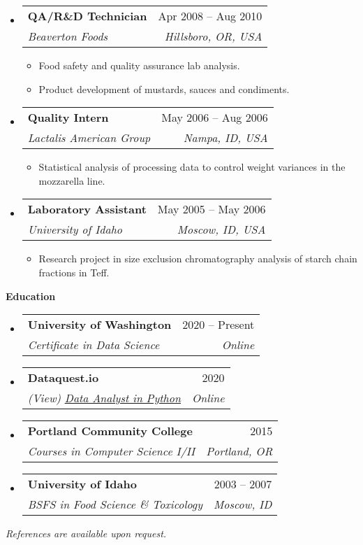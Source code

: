 \documentclass[letterpaper,12pt]{article}[leftmargin=*]
\makeatletter
\def \entryspacing {-0pt}
\newcommand{\education}[2]{\vspace{6pt}
  \colorbox{Copper}{\color{white}\raggedbottom\normalsize\textbf{{#1}{\hspace{9pt}#2\hspace{4pt}}}}
}
\newcommand{\resumeEntryStart}{\begin{itemize}[leftmargin=2.5mm]}
\newcommand{\resumeEntryEnd}{\end{itemize}\vspace{\entryspacing}}
\newcommand{\resumeItemListStart}{\begin{itemize}[leftmargin=4.5mm]}
\newcommand{\resumeItemListEnd}{\end{itemize}}
\newcommand{\resumeItem}[1]{
  \item\small{
    {#1 \vspace{-2pt}}
  }
}
\newcommand{\resumeEntryTSDL}[4]{
  \vspace{-1pt}\item[]
    \begin{tabularx}{0.97\textwidth}{X@{\hspace{60pt}}r}
      \textbf{\color{primary}#1} & {\firabook\color{accent}\small#2} \\
      \textit{\color{accent}\small#3} & \textit{\color{accent}\small#4} \\
    \end{tabularx}\vspace{-6pt}
}
\makeatother
\begin{document}
  \resumeEntryStart
    \resumeEntryTSDL
      {QA/R\&D Technician}{Apr 2008 -- Aug 2010}
      {Beaverton Foods}{Hillsboro, OR, USA}
    \resumeItemListStart
      \resumeItem {Food safety and quality assurance lab analysis.}
      \resumeItem {Product development of mustards, sauces and condiments.}
    \resumeItemListEnd
  \resumeEntryEnd
  
  \resumeEntryStart
    \resumeEntryTSDL
      {Quality Intern}{May 2006 -- Aug 2006}
      {Lactalis American Group}{Nampa, ID, USA}
    \resumeItemListStart
      \resumeItem {Statistical analysis of processing data to control weight variances in the mozzarella line.}
    \resumeItemListEnd
  \resumeEntryEnd
  
  \resumeEntryStart
    \resumeEntryTSDL
      {Laboratory Assistant}{May 2005 -- May 2006}
      {University of Idaho}{Moscow, ID, USA}
    \resumeItemListStart
      \resumeItem {Research project in size exclusion chromatography analysis of starch chain fractions in Teff.}
    \resumeItemListEnd
  \resumeEntryEnd

\education{\faGraduationCap}{Education}

  \resumeEntryStart
    \resumeEntryTSDL
      {University of Washington}{2020 -- Present}
      {Certificate in Data Science}{Online}
    \resumeEntryTSDL
      {Dataquest.io}{2020}
      {(View) \href{https://app.dataquest.io/view_cert/G76HQZAT7X8UQNXKR3LR/}{\underline{Data Analyst in Python}}}{Online}
    \resumeEntryTSDL
      {Portland Community College}{2015}
      {Courses in Computer Science I/II}{Portland, OR}
    \resumeEntryTSDL
      {University of Idaho}{2003 -- 2007}
      {BSFS in Food Science \& Toxicology}{Moscow, ID}
    
  \resumeEntryEnd
  
  \bigskip 
  
  \begin{center}
    \color{accent}\small{\textit{References are available upon request.}}
  \end{center}
\end{document}
